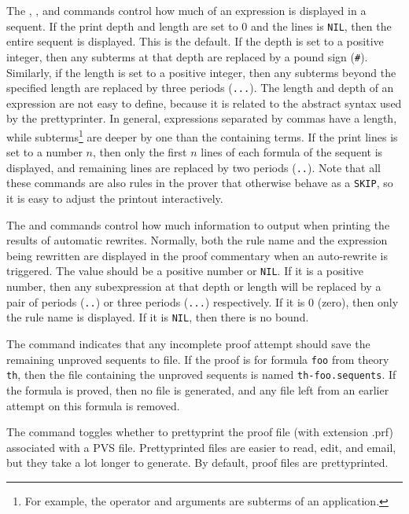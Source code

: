The , , and
 commands control how much of an expression is
displayed in a sequent.  If the print depth and length are set to 0 and
the lines is \texttt{NIL}, then the entire sequent is displayed.  This is
the default.  If the depth is set to a positive integer, then any subterms
at that depth are replaced by a pound sign (\texttt{\#}).  Similarly, if
the length is set to a positive integer, then any subterms beyond the
specified length are replaced by three periods (\texttt{...}).  The length
and depth of an expression are not easy to define, because it is related
to the abstract syntax used by the prettyprinter.  In general, expressions
separated by commas have a length, while subterms\footnote{For example,
the operator and arguments are subterms of an application.} are deeper by
one than the containing terms.  If the print lines is set to a number $n$,
then only the first $n$ lines of each formula of the sequent is displayed,
and remaining lines are replaced by two periods (\texttt{..}).  Note that
all these commands are also rules in the prover that otherwise behave as a
\texttt{SKIP}, so it is easy to adjust the printout interactively.

The  and  commands control
how much information to output when printing the results of automatic
rewrites.  Normally, both the rule name and the expression being rewritten
are displayed in the proof commentary when an auto-rewrite is triggered.
The value should be a positive number or \texttt{NIL}.  If it is a
positive number, then any subexpression at that depth or length will be
replaced by a pair of periods (\texttt{..}) or three periods
(\texttt{...}) respectively.  If it is 0 (zero), then only the rule name
is displayed.  If it is \texttt{NIL}, then there is no bound.

The  command indicates that any incomplete proof
attempt should save the remaining unproved sequents to file.  If the proof
is for formula \texttt{foo} from theory \texttt{th}, then the file
containing the unproved sequents is named \texttt{th-foo.sequents}.  If
the formula is proved, then no file is generated, and any file left from
an earlier attempt on this formula is removed.

The  command toggles whether to
prettyprint the proof file (with extension .prf) associated with a PVS
file.  Prettyprinted files are easier to read, edit, and email, but they
take a lot longer to generate.  By default, proof files are prettyprinted.

